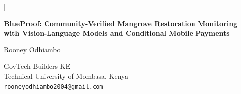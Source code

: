 \documentclass[10pt,twocolumn,a4paper]{article}
\begin{document}
\twocolumn[
\begin{@twocolumnfalse}
\begin{center}
{\LARGE\bfseries BlueProof: Community-Verified Mangrove Restoration Monitoring\\[2pt]
with Vision-Language Models and Conditional Mobile Payments\par}
\vspace{10pt}
{\large Rooney Odhiambo\par}
\vspace{3pt}
{\normalsize GovTech Builders KE\\
Technical University of Mombasa, Kenya\\
\texttt{rooneyodhiambo2004@gmail.com}\par}
\vspace{10pt}
\end{center}


\end{@twocolumnfalse}
\end{document}
